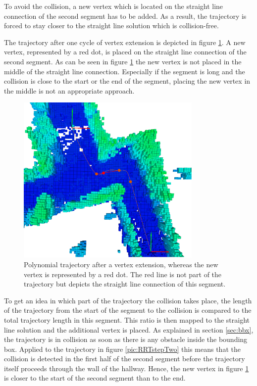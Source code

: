 To avoid the collision, a new vertex which is located on the straight line connection of the second segment has to be added. As a result, the trajectory is forced to stay closer to the straight line solution which is collision-free. \newline

The trajectory after one cycle of vertex extension is depicted in figure \ref{pic:RRTstep3}. A new vertex, represented by a red dot, is placed on the straight line connection of the second segment. \newline
As can be seen in figure \ref{pic:RRTstep3} the new vertex is not placed in the middle of the straight line connection. Especially if the segment is long and the collision is close to the start or the end of the segment, placing the new vertex in the middle is not an appropriate approach. \newline

\begin{figure}[h]
   \centering
   \includegraphics[trim = 45mm 0mm 35mm 5mm, clip,width=0.8\textwidth]{pics/extensionBLongPred.eps}
   \caption{Polynomial trajectory after a vertex extension, whereas the new vertex is represented by a red dot. The red line is not part of the trajectory but depicts the straight line connection of this segment.}
\label{pic:RRTstep3}
\end{figure}


To get an idea in which part of the trajectory the collision takes place, the length of the trajectory from the start of the segment to the collision is compared to the total trajectory length in this segment. This ratio is then mapped to the straight line solution and the additional vertex is placed. 
As explained in section \ref{sec:bbx}, the trajectory is in collision as soon as there is any obstacle inside the bounding box. Applied to the trajectory in figure \ref{pic:RRTstepTwo} this means that the collision is detected in the first half of the second segment before the trajectory itself proceeds through the wall of the hallway. Hence, the new vertex in figure \ref{pic:RRTstep3} is closer to the start of the second segment than to the end.



